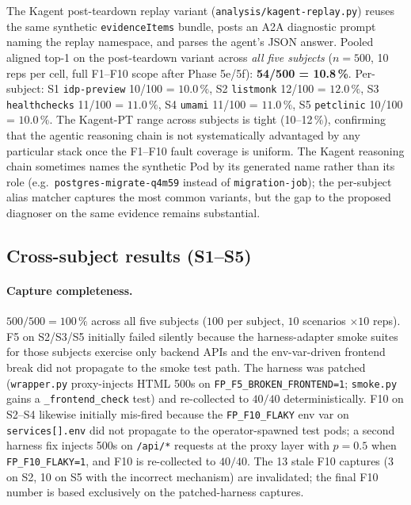 \documentclass[sigconf, nonacm=true, anonymous=false, review=false]{acmart}
\newcommand{\fn}[1]{F#1\xspace}
\begin{document}
The Kagent post-teardown replay variant
(\texttt{analysis/kagent-replay.py}) reuses the same synthetic
\texttt{evidenceItems} bundle, posts an A2A diagnostic prompt
naming the replay namespace, and parses the agent's JSON answer.
Pooled aligned top-1 on the post-teardown variant across
\emph{all five subjects} ($n=500$, 10 reps per cell, full F1--F10
scope after Phase 5e/5f): \textbf{54/500 = 10.8\,\%}.
Per-subject: S1 \texttt{idp-preview} 10/100 = $10.0\,\%$,
S2 \texttt{listmonk} 12/100 = $12.0\,\%$,
S3 \texttt{healthchecks} 11/100 = $11.0\,\%$,
S4 \texttt{umami} 11/100 = $11.0\,\%$,
S5 \texttt{petclinic} 10/100 = $10.0\,\%$. The Kagent-PT range
across subjects is tight (10--12\,\%), confirming that the
agentic reasoning chain is not systematically advantaged by any
particular stack once the F1--F10 fault coverage is uniform. The Kagent reasoning chain sometimes names the
synthetic Pod by its generated name rather than its role
(e.g.\ \texttt{postgres-migrate-q4m59} instead of \texttt{migration-job});
the per-subject alias matcher captures the most common variants,
but the gap to the proposed diagnoser on the same evidence remains
substantial.

\subsection{Cross-subject results (S1--S5)}
\label{sec:multi-app}

\paragraph{Capture completeness.} $500 / 500 = 100\,\%$ across all
five subjects ($100$ per subject, $10$ scenarios $\times 10$ reps).
\fn{5} on S2/S3/S5 initially
failed silently because the harness-adapter smoke suites for those
subjects exercise only backend APIs and the env-var-driven frontend
break did not propagate to the smoke test path. The harness was
patched (\texttt{wrapper.py} proxy-injects HTML 500s on
\texttt{FP\_F5\_BROKEN\_FRONTEND=1}; \texttt{smoke.py} gains a
\texttt{\_frontend\_check} test) and re-collected to $40/40$
deterministically. \fn{10} on S2--S4 likewise initially mis-fired
because the \texttt{FP\_F10\_FLAKY} env var on
\texttt{services[].env} did not propagate to the operator-spawned
test pods; a second harness fix injects 500s on \texttt{/api/*}
requests at the proxy layer with $p = 0.5$ when
\texttt{FP\_F10\_FLAKY=1}, and \fn{10} is re-collected to $40/40$.
The 13 stale \fn{10} captures (3 on S2, 10 on S5 with the
incorrect mechanism) are invalidated; the final \fn{10} number is
based exclusively on the patched-harness captures.
\end{document}
